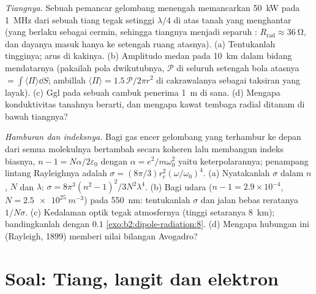 \begin{exercise}[$\star\star\star$]\label{exo:b2:dipole-radiation:11}
\emph{Tiangnya.} Sebuah pemancar gelombang menengah memancarkan \qty{50}{kW} pada \qty{1}{MHz} dari sebuah
tiang tegak setinggi $\lambda/4$ di atas tanah yang menghantar (yang berlaku
sebagai cermin, sehingga tiangnya menjadi separuh : $R_{\text{rad}} \approx
\qty{36}{\ohm}$, dan dayanya masuk hanya ke setengah ruang atasnya). (a)
Tentukanlah tingginya; arus di kakinya. (b) Amplitudo medan pada \qty{10}{km} dalam
bidang mendatarnya (pakailah pola dwikutubnya, $\mathcal P$ di seluruh
setengah bola atasnya $= \int\langle\Pi\rangle\dd S$; ambillah $\langle\Pi\rangle = 1.5\,
\mathcal P/2\pi r^2$ di cakrawalanya sebagai taksiran yang layak). (c) Ggl pada
sebuah cambuk penerima \qty{1}{m} di sana. (d) Mengapa konduktivitas tanahnya
berarti, dan mengapa kawat tembaga radial ditanam di bawah tiangnya?
\end{exercise}

\begin{exercise}[$\star\star\star$]\label{exo:b2:dipole-radiation:12}
\emph{Hamburan dan indeksnya.} Bagi gas encer gelombang yang terhambur ke
depan dari semua molekulnya bertambah secara koheren lalu membangun indeks biasnya,
$n - 1 = N\alpha/2\varepsilon_0$ dengan $\alpha = e^2/m\omega_0^2$ yaitu keterpolarannya;
penampang lintang Rayleighnya adalah $\sigma = (8\pi/3)r_e^2(\omega/\omega_0)^4$. (a) Nyatakanlah
$\sigma$ dalam $n$, $N$ dan $\lambda$: $\sigma = 8\pi^3(n^2 - 1)^2/3N^2\lambda^4$. (b)
Bagi udara ($n - 1 = 2.9 \times 10^{-4}$, $N = \qty{2.5e25}{m^{-3}}$) pada \qty{550}{nm}:
tentukanlah $\sigma$ dan jalan bebas reratanya $1/N\sigma$. (c) Kedalaman optik tegak
atmosfernya (tinggi setaranya \qty{8}{km}); bandingkanlah dengan $0.1$
\cref{exo:b2:dipole-radiation:8}. (d) Mengapa hubungan ini (Rayleigh,
1899) memberi nilai bilangan Avogadro?
\end{exercise}

\section{Soal: Tiang, langit dan elektron}

